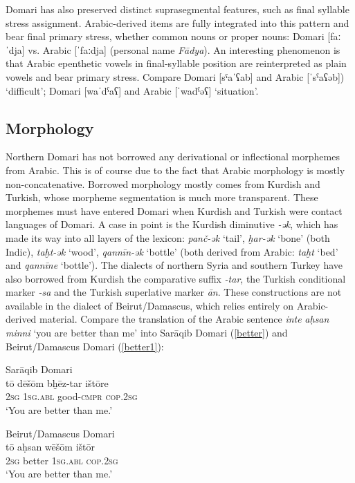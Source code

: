 \documentclass[output=paper]{langsci/langscibook}
\begin{document}
Domari has also preserved distinct suprasegmental features, such as final syllable stress assignment. Arabic-derived items are fully integrated into this pattern and bear final primary stress, whether common nouns or proper nouns: Domari [faːˈdja] vs. Arabic [ˈfaːdja] (personal name \textit{Fādya}). An interesting phenomenon is that Arabic epenthetic vowels in final-syllable position are reinterpreted as plain vowels and bear primary stress.  Compare Domari [sˤaˈʕab] and Arabic [ˈsˁaʕəb]) ‘difficult’; Domari [waˈdˁaʕ] and Arabic [ˈwadˁəʕ] ‘situation’.


 
 \subsection{Morphology}


Northern Domari has not borrowed any derivational or inflectional morphemes from Arabic. This is of course due to the fact that Arabic morphology is mostly non-concatenative. Borrowed morphology mostly comes from Kurdish and Turkish, whose morpheme segmentation is much more transparent. These morphemes must have entered Domari when Kurdish and Turkish were contact languages of Domari. A case in point is the Kurdish diminutive \textit{-ək}, which has made its way into all layers of the lexicon: \textit{panč-ək} ‘tail’, \textit{ḫar-ək} ‘bone’ (both Indic), \textit{taḫt-ək} ‘wood’, \textit{qannīn-ək} ‘bottle’ (both derived from Arabic: \textit{taḫt} ‘bed’ and \textit{qannīne} ‘bottle’). The dialects of northern Syria and southern Turkey have also borrowed from Kurdish the comparative suffix \textit{{}-tar}, the Turkish conditional marker \textit{{}-sa} and the Turkish superlative marker \textit{ān}. These constructions are not available in the dialect of Beirut/Damascus, which relies entirely on Arabic-derived material. Compare the translation of the Arabic sentence \textit{inte} \textit{aḥsan} \textit{minni} ‘you are better than me’ into Sarāqib Domari (\ref{better}) and Beirut/Damascus Domari (\ref{better1}):

\ea
{Sarāqib Domari}\\ \label{better}
\gll tō dēšōm bḫēz-tar ištōre\\
     \textsc{2sg} \textsc{1sg.abl} good\textsc{-cmpr} \textsc{cop.2sg}\\
\glt ‘You are better than me.’
\z

\ea 
{Beirut/Damascus Domari}\\ \label{better1}
\gll tō aḥsan wēšōm ištōr\\
 \textsc{2sg} better \textsc{1sg.abl} \textsc{cop.2sg} \\
\glt ‘You are better than me.’\\
\z
\end{document}

